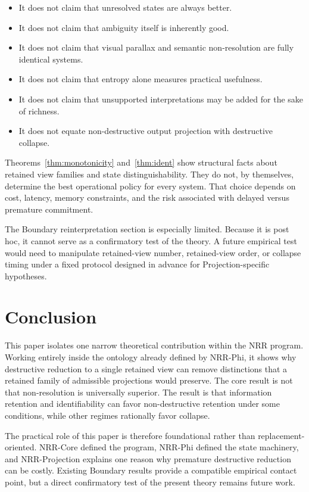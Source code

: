 \documentclass[11pt,a4paper]{article}
\begin{document}
\begin{itemize}
  \item It does not claim that unresolved states are always better.
  \item It does not claim that ambiguity itself is inherently good.
  \item It does not claim that visual parallax and semantic non-resolution are fully identical systems.
  \item It does not claim that entropy alone measures practical usefulness.
  \item It does not claim that unsupported interpretations may be added for the sake of richness.
  \item It does not equate non-destructive output projection with destructive collapse.
\end{itemize}

Theorems~\ref{thm:monotonicity} and~\ref{thm:ident} show structural facts about retained view families and state distinguishability. They do not, by themselves, determine the best operational policy for every system. That choice depends on cost, latency, memory constraints, and the risk associated with delayed versus premature commitment.

The Boundary reinterpretation section is especially limited. Because it is post hoc, it cannot serve as a confirmatory test of the theory. A future empirical test would need to manipulate retained-view number, retained-view order, or collapse timing under a fixed protocol designed in advance for Projection-specific hypotheses.

\section{Conclusion}
\label{sec:conclusion}

This paper isolates one narrow theoretical contribution within the NRR program. Working entirely inside the ontology already defined by NRR-Phi, it shows why destructive reduction to a single retained view can remove distinctions that a retained family of admissible projections would preserve. The core result is not that non-resolution is universally superior. The result is that information retention and identifiability can favor non-destructive retention under some conditions, while other regimes rationally favor collapse.

The practical role of this paper is therefore foundational rather than replacement-oriented. NRR-Core defined the program, NRR-Phi defined the state machinery, and NRR-Projection explains one reason why premature destructive reduction can be costly. Existing Boundary results provide a compatible empirical contact point, but a direct confirmatory test of the present theory remains future work.
\end{document}
